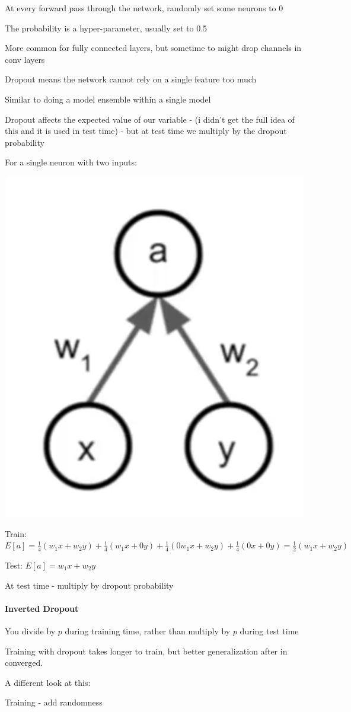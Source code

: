 At every forward pass through the network, randomly set some neurons to 0

The probability is a hyper-parameter, usually set to 0.5

More common for fully connected layers, but sometime to might drop channels in conv layers

Dropout means  the network cannot rely on a single feature too much

Similar to doing a model ensemble within a single model

Dropout affects the expected value of our variable - (i didn't get  the full idea of this and it is used in test time) - but at test time we multiply by the dropout probability

For a single neuron with two inputs:

\includegraphics[width=0.5\columnwidth]{fei_fei_li/lecture_07/Screenshot 2019-10-21 at 11.32.00.png}

Train: $E[a] = \frac{1}{4}(w_1x+w_2y)+\frac{1}{4}(w_1x+0y)+\frac{1}{4}(0w_1x+w_2y)+\frac{1}{4}(0x+0y) = \frac{1}{2}(w_1x+w_2y)$

Test: $E[a] = w_1x+w_2y$

At test time - multiply by dropout probability

\paragraph{Inverted Dropout}

You divide by $p$ during training time, rather than multiply by $p$ during test time

Training with dropout takes longer to train, but better generalization after in converged.

A different look at this: 

Training - add randomness


